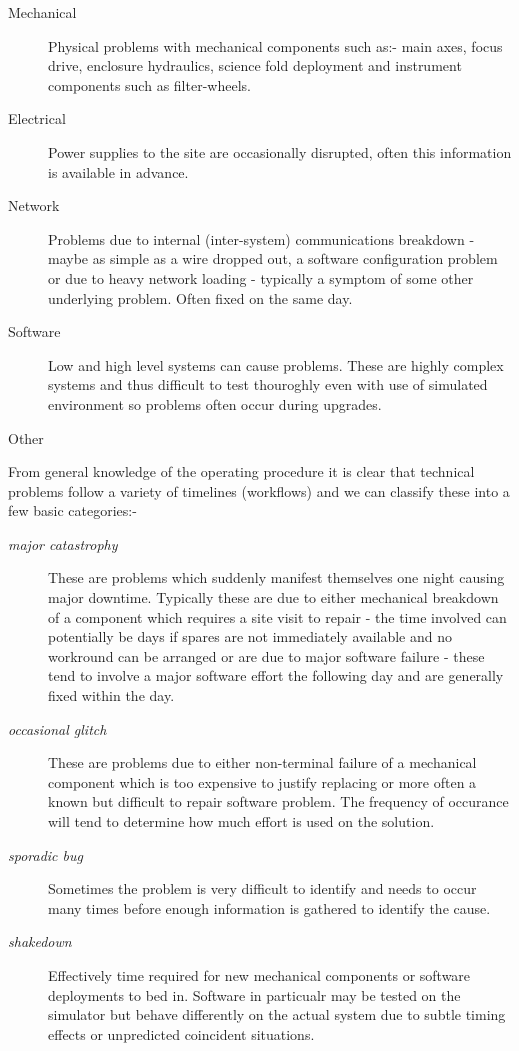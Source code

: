 \begin{description}
\item [Mechanical] Physical problems with mechanical components such as:- main axes, focus drive, enclosure hydraulics, science fold deployment and instrument components such as filter-wheels.
\item [Electrical] Power supplies to the site are occasionally disrupted, often this information is available in advance.
\item [Network] Problems due to internal (inter-system) communications breakdown - maybe as simple as a wire dropped out, a software configuration problem or due to heavy network loading - typically a symptom of some other underlying problem. Often fixed on the same day. 
\item [Software] Low and high level systems can cause problems. These are highly complex systems and thus difficult to test thouroghly even with use of simulated environment so problems often occur during upgrades. 
\item [Other]
\end{description}

From general knowledge of the operating procedure it is clear that technical problems follow a variety of timelines (workflows) and we can classify these into a few basic categories:-
\begin{description}
\item [\emph{major catastrophy}] These are problems which suddenly manifest themselves one night causing major downtime. Typically these are due to either mechanical breakdown of a component which requires a site visit to repair - the time involved can potentially be days if spares are not immediately available and no workround can be arranged or are due to major software failure - these tend to involve a major software effort the following day and are generally fixed within the day. 
\item [\emph{occasional glitch}] These are problems due to either non-terminal failure of a mechanical component which is too expensive to justify replacing or more often a known but difficult to repair software problem. The frequency of occurance will tend to determine how much effort is used on the solution.
\item [\emph{sporadic bug}] Sometimes the problem is very difficult to identify and needs to occur many times before enough information is gathered to identify the cause. 
\item [\emph{shakedown}] Effectively time required for new mechanical components or software deployments to bed in. Software in particualr may be tested on the simulator but behave differently on the actual system due to subtle timing effects or unpredicted coincident situations.
\end{description}


